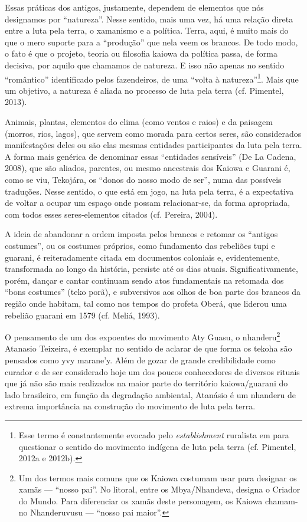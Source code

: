 Essas práticas dos antigos, justamente, dependem de elementos que nós
designamos por ``natureza''. Nesse sentido, mais uma vez, há uma relação
direta entre a luta pela terra, o xamanismo e a política. Terra, aqui,
é muito mais do que o mero suporte para a ``produção'' que nela veem os
brancos. De todo modo, o fato é que o projeto, teoria ou filosofia
kaiowa da política passa, de forma decisiva, por aquilo que chamamos de
natureza. E isso não apenas no sentido ``romântico'' identificado pelos
fazendeiros, de uma ``volta à natureza''\footnote{Esse termo é
constantemente evocado pelo \emph{establishment} ruralista em  para
questionar o sentido do movimento indígena de luta pela terra (cf.
Pimentel, 2012a e 2012b).}. Mais que um objetivo, a natureza é aliada
no processo de luta pela terra (cf. Pimentel, 2013).

Animais, plantas, elementos do clima (como ventos e raios) e da paisagem
(morros, rios, lagos), que servem como morada para certos seres, são
considerados manifestações deles ou são elas mesmas entidades
participantes da luta pela terra. A forma mais genérica de denominar
essas ``entidades sensíveis'' (De La Cadena, 2008), que são aliados,
parentes, ou mesmo ancestrais dos Kaiowa e Guarani é, como se viu,
Tekojára, os ``donos do nosso modo de ser'', numa das possíveis
traduções. Nesse sentido, o que está em jogo, na luta pela terra, é a
expectativa de voltar a ocupar um espaço onde possam relacionar-se, da
forma apropriada, com todos esses seres-elementos citados (cf. Pereira,
2004).

A ideia de abandonar a ordem imposta pelos brancos e retomar os ``antigos
costumes'', ou os costumes próprios, como fundamento das rebeliões tupi
e guarani, é reiteradamente citada em documentos coloniais e,
evidentemente, transformada ao longo da história, persiste até os dias
atuais. Significativamente, porém, dançar e cantar continuam sendo atos
fundamentais na retomada dos ``bons costumes'' (teko porã), e subversivos
aos olhos de boa parte dos brancos da região onde habitam, tal como nos
tempos do profeta Oberá, que liderou uma rebelião guarani em 1579 (cf.
Meliá, 1993).

O pensamento de um dos expoentes do movimento Aty Guasu, o
nhanderu\footnote{Um dos termos mais comuns que os Kaiowa costumam usar
para designar os xamãs — ``nosso pai''. No litoral, entre os
Mbya/Nhandeva, designa o Criador do Mundo. Para diferenciar os xamãs
deste personagem, os Kaiowa chamam-no Nhanderuvusu — ``nosso pai
maior''.} Atanasio Teixeira, é exemplar no sentido de aclarar de que
forma os tekoha são pensados como yvy marane’y. Além de gozar de grande
credibilidade como curador e de ser considerado hoje um dos poucos
conhecedores de diversos rituais que já não são mais realizados na
maior parte do território kaiowa/guarani do lado brasileiro, em função
da degradação ambiental, Atanásio é um nhanderu de extrema importância
na construção do movimento de luta pela terra. 

